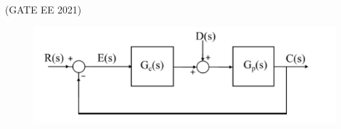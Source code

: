 \begin{enumerate}[label=\thechapter.\arabic*,ref=\thechapter.\theenumi]
\hfill{(GATE EE 2021)}\\
\begin{figure}[h!]
    \centering
    \includegraphics[width=\columnwidth]{2021/EE/47/figs/fig.png}
    \caption{}
    \label{fig:sr40}
\end{figure}
\\
\solution

\pagebreak
\end{enumerate}
